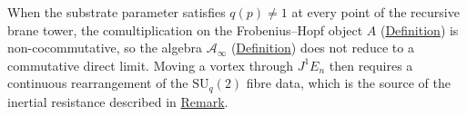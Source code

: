 \begin{remark}
  \label{rem:mass-noncommutative-drag}
When the substrate parameter satisfies $q(p) \neq 1$ at every point of the recursive brane tower, the comultiplication on the Frobenius--Hopf object $A$
(\hyperref[def:quantum-universe]{Definition}) is non-cocommutative, so the
algebra $\mathcal{A}_\infty$ (\hyperref[def:direct-limit-algebra]{Definition})
does not reduce to a commutative direct limit.  Moving a vortex through
$J^1 E_n$ then requires a continuous rearrangement of the
$\mathrm{SU}_q(2)$ fibre data, which is the source of the inertial
resistance described in \hyperref[rem:mass-geometric-drag]{Remark}.
\end{remark}

